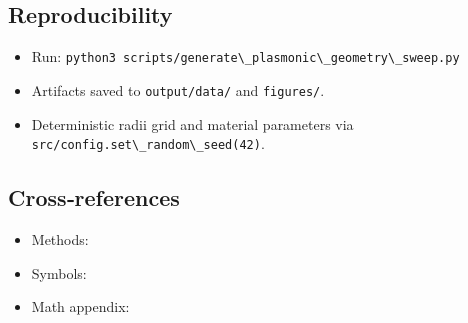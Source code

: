 \documentclass[
  13pt,
  a4paperpaper,
  12pt]{article}
\newcommand{\passthrough}[1]{#1}
\providecommand{\tightlist}{%
  \setlength{\itemsep}{0pt}\setlength{\parskip}{0pt}}
\begin{document}
\subsection{Reproducibility}\label{reproducibility}

\begin{itemize}
\tightlist
\item
  Run:
  \passthrough{\lstinline!python3 scripts/generate\_plasmonic\_geometry\_sweep.py!}
\item
  Artifacts saved to \passthrough{\lstinline!output/data/!} and
  \passthrough{\lstinline!figures/!}.
\item
  Deterministic radii grid and material parameters via
  \passthrough{\lstinline!src/config.set\_random\_seed(42)!}.
\end{itemize}

\subsection{Cross‑references}\label{crossreferences}

\begin{itemize}
\tightlist
\item
  Methods: 
\item
  Symbols: 
\item
  Math appendix: 
\end{itemize}
\end{document}
